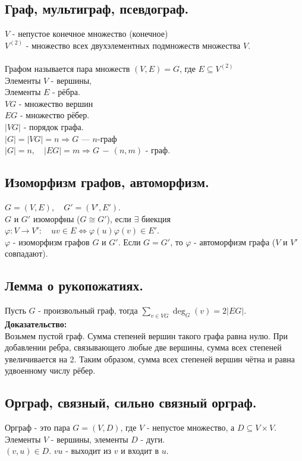 \documentclass[12pt]{article}
\begin{document}
\subsection{Граф, мультиграф, псевдограф.}
	$V$ - непустое конечное множество (конечное)\\
	$V^{(2)}$ - множество всех двухэлементных подмножеств множества $V$.\\ \\
	Графом называется пара множеств $(V,E) = G$, где $E \subseteq V^{(2)}$\\
	Элементы $V$ - вершины,\\
	Элементы $E$ - рёбра.\\
	$VG$ - множество вершин\\
	$EG$ - множество рёбер.\\
	$|VG|$ - порядок графа.\\
	$|G| = |VG|=n  \Rightarrow G$ — $n$-граф\\
	$|G|=n, \quad |EG|=m \Rightarrow G\,-\, (n,m)$ - граф.\\
\subsection{Изоморфизм графов, автоморфизм.}
	$G=(V,E), \quad G'=(V', E')$.\\
	$G$ и $G'$ изоморфны ($ G \cong G'$), если $\exists$ биекция $\varphi:V \rightarrow V': \quad uv \in E \Leftrightarrow \varphi(u)\varphi(v) \in E'$.\\
	$\varphi$ - изоморфизм графов $G$ и $G'$.
	Если $G=G'$, то $\varphi$ - автоморфизм графа ($V$ и $V'$ совпадают).
\subsection{Лемма о рукопожатиях.}
	Пусть $G$ - произвольный граф, тогда $ \displaystyle \sum_{v \in VG}  \operatorname{deg}_G(v) = 2|EG|$.\\
	\textbf{Доказательство:}\\
		Возьмем пустой граф. Сумма степеней вершин такого графа равна нулю. При добавлении ребра, связывающего любые две вершины, сумма всех степеней увеличивается на 2. Таким образом, сумма всех степеней вершин чётна и равна удвоенному числу рёбер.\\ 
	\qedsymbol
\subsection{Орграф, связный, сильно связный орграф.}
	Орграф - это пара $G=(V,D)$, где $V$ - непустое множество, а $D \subseteq V \times V$. Элементы $V$ - вершины, элементы $D$ - дуги.\\
	$(v,u) \in D$. $vu$ - выходит из $v$ и входит в $u$.\\\\
\end{document}
